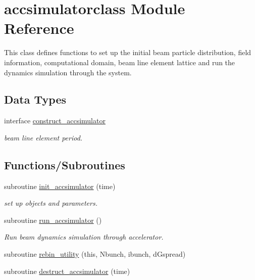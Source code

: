 \hypertarget{namespaceaccsimulatorclass}{}\section{accsimulatorclass Module Reference}
\label{namespaceaccsimulatorclass}


This class defines functions to set up the initial beam particle distribution, field information, computational domain, beam line element lattice and run the dynamics simulation through the system.  


\subsection*{Data Types}
\begin{DoxyCompactItemize}
\item 
interface \mbox{\hyperlink{interfaceaccsimulatorclass_1_1construct__accsimulator}{construct\+\_\+accsimulator}}
\begin{DoxyCompactList}\small\item\em beam line element period. \end{DoxyCompactList}\end{DoxyCompactItemize}
\subsection*{Functions/\+Subroutines}
\begin{DoxyCompactItemize}
\item 
subroutine \mbox{\hyperlink{namespaceaccsimulatorclass_a6a90186281758191cfa3ef4fc9c54078}{init\+\_\+accsimulator}} (time)
\begin{DoxyCompactList}\small\item\em set up objects and parameters. \end{DoxyCompactList}\item 
subroutine \mbox{\hyperlink{namespaceaccsimulatorclass_acbe26eeaf1cb4076384b90e1016785f0}{run\+\_\+accsimulator}} ()
\begin{DoxyCompactList}\small\item\em Run beam dynamics simulation through accelerator. \end{DoxyCompactList}\item 
subroutine \mbox{\hyperlink{namespaceaccsimulatorclass_af2b7d5e3857ef686e1fb07f1d6abc800}{rebin\+\_\+utility}} (this, Nbunch, ibunch, d\+Gspread)
\item 
subroutine \mbox{\hyperlink{namespaceaccsimulatorclass_a7bcc6275f447513b2ea5d85d46aade2a}{destruct\+\_\+accsimulator}} (time)
\end{DoxyCompactItemize}
